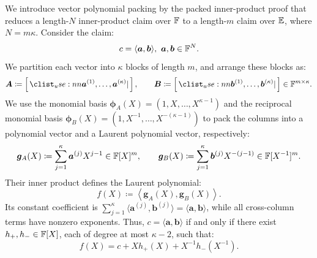 We introduce vector polynomial packing by the packed inner-product proof that reduces a
length-\(N\) inner-product claim over \({\mathbb{F}}\) to a
length-\(m\) claim over \(\mathbb{E}\), where \(N=m\kappa\).
Consider the claim:
\[
    c=\langle\bm a,\bm b\rangle,
    ~
    \bm a,\bm b\in{\mathbb{F}}^N.
\]
We partition each vector into \(\kappa\) blocks of length \(m\), and
arrange these blocks as:
\begin{equation}
\label{eq:matAB}
    \bm A
    \coloneqq
    \concat{
        \bm a^{(1)},\ldots,\bm a^{(\kappa)}
    },
    \qquad
    \bm B
    \coloneqq
    \concat{
        \bm b^{(1)},\ldots,\bm b^{(\kappa)}
    }
    \in\Field^{m\times\kappa}.
\end{equation}
We use the monomial basis
\(
    \bm{\phi}_A(X)
    =
    (1,X,\ldots,X^{\kappa-1})
\)
and the reciprocal monomial basis
\(
    \bm{\phi}_B(X)
    =
    (1,X^{-1},\ldots,X^{-(\kappa-1)})
\)
to pack the columns into a polynomial vector and a Laurent
polynomial vector, respectively:
\[
    \bm g_A(X)
    \coloneqq
    \sum_{j=1}^{\kappa}\bm a^{(j)}X^{j-1}
    \in{\mathbb{F}}[X]^m,
    \qquad
    \bm g_B(X)
    \coloneqq
    \sum_{j=1}^{\kappa}\bm b^{(j)}X^{-(j-1)}
    \in{\mathbb{F}}[X^{-1}]^m.
\]
Their inner product defines the Laurent polynomial:
\begin{equation}
    f(X)
    \coloneqq
    \left\langle
        \bm g_A(X),\bm g_B(X)
    \right\rangle.
\label{eq:ip-laurent-polynomial}
\end{equation}
Its constant coefficient is
\(\sum_{j=1}^{\kappa}
\langle\bm a^{(j)},\bm b^{(j)}\rangle
=\langle\bm a,\bm b\rangle\),
while all cross-column terms have nonzero exponents.
Thus, \(c=\langle\bm a,\bm b\rangle\) if and only if there
exist \(h_+,h_-\in{\mathbb{F}}[X]\), each of degree at most
\(\kappa-2\), such that:
\begin{equation}
    f(X)
    =
    c
    +Xh_+(X)
    +X^{-1}h_-(X^{-1}).
\label{eq:ip-correction-identity}
\end{equation}

